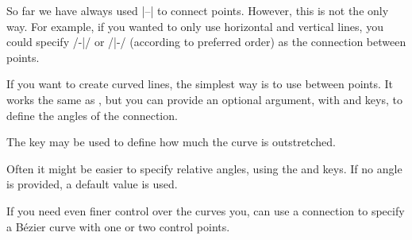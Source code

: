So far we have always used \ltx|--| to connect points. However,
this is not the only way. For example, if you wanted to only use horizontal and
vertical lines, you could specify \ltx/-|/ or \ltx/|-/ (according to preferred
order) as the connection between points.
\begin{example}
\end{example}

If you want to create curved lines, the simplest way is to use 
between points. It works the same as \ltx{--}, but you can provide an optional
argument, with  and  keys, to define the angles of
the connection.%
\begin{example}[vertical_mode, examplewidth=0.8\linewidth]
\tikzset{baseline} \vspace{-0.3cm} %
\vspace{-0.5cm} %
\end{example}
The  key may be used to define how much the curve is
outstretched.
\begin{example}[vertical_mode, examplewidth=0.8\linewidth]
\tikzset{baseline} \vspace{-1cm} %
\vspace{-1cm} %
\end{example}
Often it might be easier to specify relative angles, using the  and  keys. If no angle is provided, a default value is
used.
\begin{example}[vertical_mode, examplewidth=0.8\linewidth]
\end{example}

If you need even finer control over the curves you, can use a
 connection to specify a Bézier curve with one
or two control points.
\begin{chktexignore}
\begin{example}[vertical_mode, examplewidth=0.8\linewidth]
\vspace{-0.5cm} %
\end{example}
\end{chktexignore}


